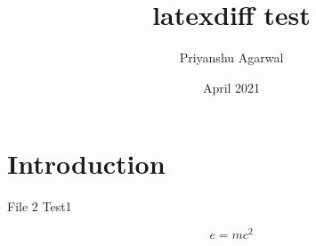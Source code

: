 \documentclass{article}
\title{latexdiff test}
\author{Priyanshu Agarwal}
\date{April 2021}
\begin{document}
\maketitle

\section{Introduction}

File 2
Test1

\begin{equation}
    e = mc^2
\end{equation}
\end{document}
